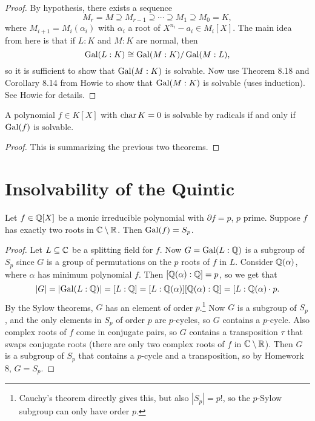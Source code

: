 \begin{proof}
  By hypothesis, there exists a sequence
  \[
    M_r = M \supseteq M_{r - 1} \supseteq \cdots \supseteq M_1 \supseteq M_0 = K,
  \]
  where $M_{i + 1} = M_i(\alpha_i)$ with $\alpha_i$
  a root of $X^{n_i} - a_i \in M_i[X]$.
  The main idea from here is that if $L : K$ and
  $M : K$ are normal, then
  \[
    \operatorname{Gal}(L : K) \cong \operatorname{Gal}(M : K) / \operatorname{Gal}(M : L),
  \]
  so it is sufficient to show that $\operatorname{Gal}(M : K)$ is
  solvable. Now use Theorem 8.18 and Corollary 8.14 from
  Howie to show that $\operatorname{Gal}(M : K)$ is solvable (uses
  induction). See Howie for details.
\end{proof}

\begin{theorem}
  A polynomial $f \in K[X]$ with $\operatorname{char} K = 0$ is
  solvable by radicals if and only if $\operatorname{Gal}(f)$ is
  solvable.
\end{theorem}

\begin{proof}
  This is summarizing the previous two theorems.
\end{proof}

\section{Insolvability of the Quintic}

\begin{theorem}
  Let $f \in \mathbb{Q}[X]$ be a monic irreducible polynomial
  with $\partial f = p$, $p$ prime. Suppose $f$ has
  exactly two roots in $\mathbb{C} \setminus \mathbb{R}$. Then
  $\operatorname{Gal}(f) = S_p$.
\end{theorem}

\begin{proof}
  Let $L \subseteq \mathbb{C}$ be a splitting field for $f$. Now
  $G = \operatorname{Gal}(L : \mathbb{Q})$ is a subgroup of $S_p$ since
  $G$ is a group of permutations on the $p$ roots of $f$
  in $L$. Consider $\mathbb{Q}(\alpha)$, where $\alpha$ has
  minimum polynomial $f$. Then $[\mathbb{Q}(\alpha) : \mathbb{Q}] = p$, so
  we get that
  \[
    |G| = |{\operatorname{Gal}(L : \mathbb{Q})}| = [L : \mathbb{Q}] = [L : \mathbb{Q}(\alpha)] [\mathbb{Q}(\alpha) : \mathbb{Q}]
    = [L : \mathbb{Q}(\alpha) \cdot p.
  \]
  By the Sylow theorems, $G$ has an element of order $p$.\footnote{Cauchy's theorem directly gives this, but also $|S_p| = p!$, so the $p$-Sylow subgroup can only have order $p$.}
  Now $G$ is a subgroup of $S_p$, and the only elements
  in $S_p$ of order $p$ are $p$-cycles, so
  $G$ contains a $p$-cycle. Also complex roots of
  $f$ come in conjugate pairs, so $G$ contains a
  transposition $\tau$ that swaps conjugate roots (there
  are only two complex roots of $f$ in $\mathbb{C} \setminus \mathbb{R}$).
  Then $G$ is a subgroup of $S_p$ that contains a
  $p$-cycle and a transposition, so by Homework 8,
  $G = S_p$.
\end{proof}

